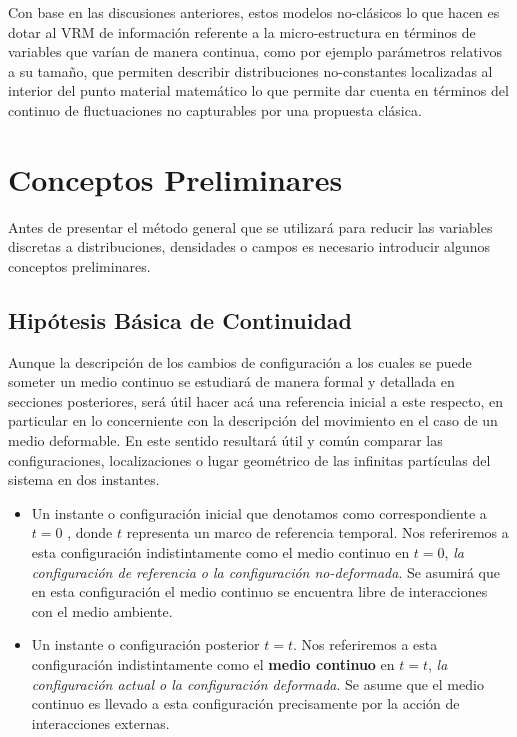 \documentclass[../notas medios.tex]{subfiles}
\begin{document}
Con base en las discusiones anteriores, estos modelos no-clásicos lo que hacen es dotar al VRM de información referente a la micro-estructura en términos de variables que varían de manera continua, como por ejemplo parámetros relativos a su tamaño, que permiten describir distribuciones no-constantes localizadas al interior del punto material matemático lo que permite dar cuenta en términos del continuo de fluctuaciones no capturables por una propuesta clásica.

\section{Conceptos Preliminares}
Antes de presentar el método general que se utilizará para reducir las variables discretas a distribuciones, densidades o campos es necesario introducir algunos conceptos preliminares.

\subsection{Hipótesis Básica de Continuidad}
Aunque la descripción de los cambios de configuración a los cuales se puede someter un medio continuo se estudiará de manera formal y detallada en secciones posteriores, será útil hacer acá una referencia inicial a este respecto, en particular en lo concerniente con la descripción del movimiento en el caso de un medio deformable.  En este sentido resultará útil y común comparar las configuraciones, localizaciones o lugar geométrico de las infinitas partículas del sistema en dos instantes.

\begin{itemize}
\item Un instante o configuración inicial que denotamos como correspondiente a $t=0$ , donde $t$ representa un marco de referencia temporal.  Nos referiremos a esta configuración indistintamente como el medio continuo en $t=0$, \textit{la configuración de referencia o la configuración no-deformada}.  Se asumirá que en esta configuración el medio continuo se encuentra libre de interacciones con el medio ambiente.

\item Un instante o configuración posterior $t=t$.  Nos referiremos a esta configuración indistintamente como el {\bf medio continuo} en $t=t$, \textit{la configuración actual o la configuración deformada}.  Se asume que el medio continuo es llevado a esta configuración precisamente por la acción de interacciones externas. 

\end{itemize}
\end{document}
